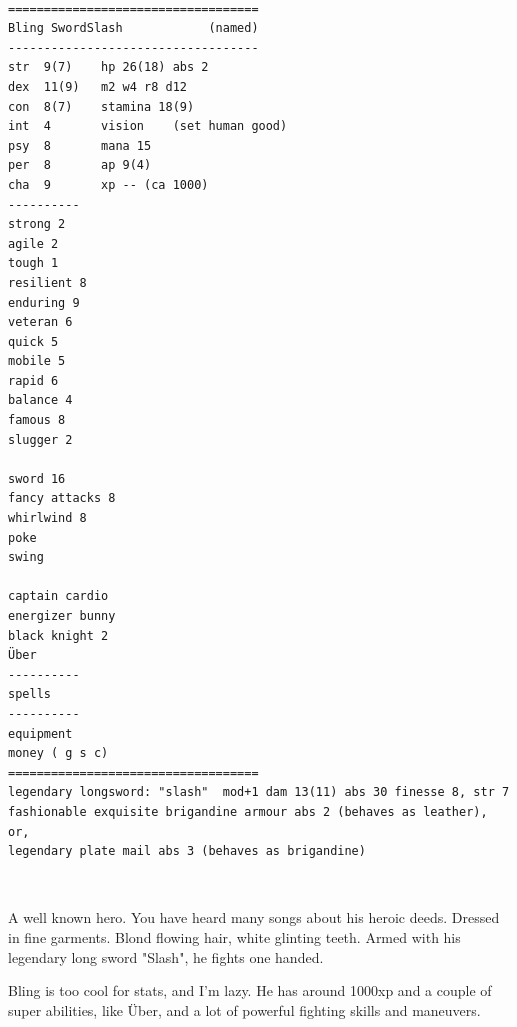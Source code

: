 \

\goodbreak \begin{samepage} \vsmall \begin{verbatim}
===================================
Bling SwordSlash            (named)
-----------------------------------
str  9(7)    hp 26(18) abs 2
dex  11(9)   m2 w4 r8 d12
con  8(7)    stamina 18(9)
int  4       vision    (set human good)
psy  8       mana 15
per  8       ap 9(4)
cha  9       xp -- (ca 1000)
----------
strong 2
agile 2
tough 1
resilient 8
enduring 9
veteran 6
quick 5
mobile 5
rapid 6
balance 4
famous 8
slugger 2

sword 16
fancy attacks 8
whirlwind 8
poke
swing

captain cardio
energizer bunny
black knight 2
Über
----------
spells
----------
equipment
money ( g s c)
===================================
legendary longsword: "slash"  mod+1 dam 13(11) abs 30 finesse 8, str 7
fashionable exquisite brigandine armour abs 2 (behaves as leather), or,
legendary plate mail abs 3 (behaves as brigandine)
\end{verbatim} \normalsize \end{samepage}

\

A well known hero. You have heard many songs about his heroic deeds.
Dressed in fine garments. Blond flowing hair, white glinting teeth.
Armed with his legendary long sword "Slash", he fights one handed.

Bling is too cool for stats, and I'm lazy. He has around 1000xp
and a couple of super abilities, like Über, and a lot of powerful
fighting skills and maneuvers.


\

\flushbottom



























